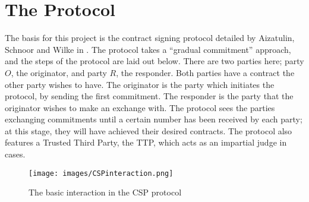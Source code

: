 \documentclass{l4proj}
\begin{document}





\chapter{The Protocol}
The basis for this project is the contract signing protocol detailed by Aizatulin, Schnoor and Wilke in \cite{ASW09}. The protocol takes a ``gradual commitment'' approach, and the steps of the protocol are laid out below. There are two parties here; party $O$, the originator, and party $R$, the responder. Both parties have a contract the other party wishes to have. The originator is the party which initiates the protocol, by sending the first commitment. The responder is the party that the originator wishes to make an exchange with. The protocol sees the parties exchanging commitments until a certain number has been received by each party; at this stage, they will have achieved their desired contracts. The protocol also features a Trusted Third Party, the TTP, which acts as an impartial judge in cases.


\begin{figure}[h!]
\centering
\texttt{[image: images/CSPinteraction.png]}
\caption{The basic interaction in the CSP protocol}
\label{csp}
\end{figure}
\end{document}
